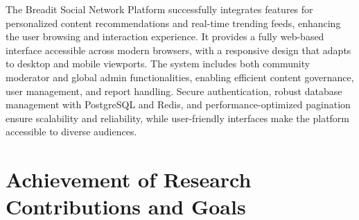 
The Breadit Social Network Platform successfully integrates features for personalized content recommendations and real-time trending feeds, enhancing the user browsing and interaction experience. It provides a fully web-based interface accessible across modern browsers, with a responsive design that adapts to desktop and mobile viewports. The system includes both community moderator and global admin functionalities, enabling efficient content governance, user management, and report handling. Secure authentication, robust database management with PostgreSQL and Redis, and performance-optimized pagination ensure scalability and reliability, while user-friendly interfaces make the platform accessible to diverse audiences.

\section{Achievement of Research Contributions and Goals}

